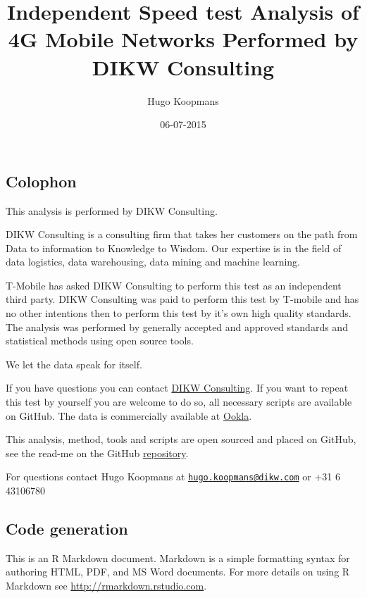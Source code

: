 \documentclass[]{article}
\title{Independent Speed test Analysis of 4G Mobile Networks Performed by DIKW
Consulting}
\author{Hugo Koopmans}
\date{06-07-2015}
\begin{document}
\maketitle

\newpage


{
\hypersetup{linkcolor=black}
\setcounter{tocdepth}{2}
\tableofcontents
}

\newpage

\newpage

\subsection{Colophon}\label{colophon}

This analysis is performed by DIKW Consulting.

DIKW Consulting is a consulting firm that takes her customers on the
path from Data to information to Knowledge to Wisdom. Our expertise is
in the field of data logistics, data warehousing, data mining and
machine learning.

T-Mobile has asked DIKW Consulting to perform this test as an
independent third party. DIKW Consulting was paid to perform this test
by T-mobile and has no other intentions then to perform this test by
it's own high quality standards. The analysis was performed by generally
accepted and approved standards and statistical methods using open
source tools.

We let the data speak for itself.

If you have questions you can contact \href{http://www.dikw.nl}{DIKW
Consulting}. If you want to repeat this test by yourself you are welcome
to do so, all necessary scripts are available on GitHub. The data is
commercially available at \href{http://www.ookla.com/}{Ookla}.

This analysis, method, tools and scripts are open sourced and placed on
GitHub, see the read-me on the GitHub
\href{https://github.com/hugokoopmans/ookla-speedtest-analysis}{repository}.

For questions contact Hugo Koopmans at
\href{mailto:hugo.koopmans@dikw.com}{\nolinkurl{hugo.koopmans@dikw.com}}
or +31 6 43106780

\subsection{Code generation}\label{code-generation}

This is an R Markdown document. Markdown is a simple formatting syntax
for authoring HTML, PDF, and MS Word documents. For more details on
using R Markdown see \url{http://rmarkdown.rstudio.com}.
\end{document}
